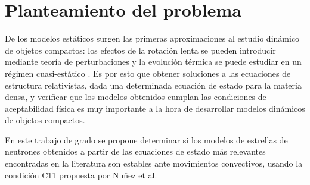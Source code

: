 \chapter{Planteamiento del problema}
De los modelos estáticos surgen las primeras aproximaciones al estudio dinámico de objetos compactos: los efectos de la rotación lenta se pueden introducir mediante teoría de perturbaciones \cite{Hartle1967} y la evolución térmica se puede estudiar en un régimen cuasi-estático \cite{Becerra2013Quasi-staticObjects}. Es por esto que obtener soluciones a las ecuaciones de estructura relativistas, dada una determinada ecuación de estado para la materia densa, y verificar que los modelos obtenidos cumplan las condiciones de aceptabilidad física es muy importante a la hora de desarrollar modelos dinámicos de objetos compactos.

En este trabajo de grado se propone determinar si los modelos de estrellas de neutrones obtenidos a partir de las ecuaciones de estado más relevantes encontradas en la literatura son estables ante movimientos convectivos, usando la condición C11 propuesta por Nuñez et al.
